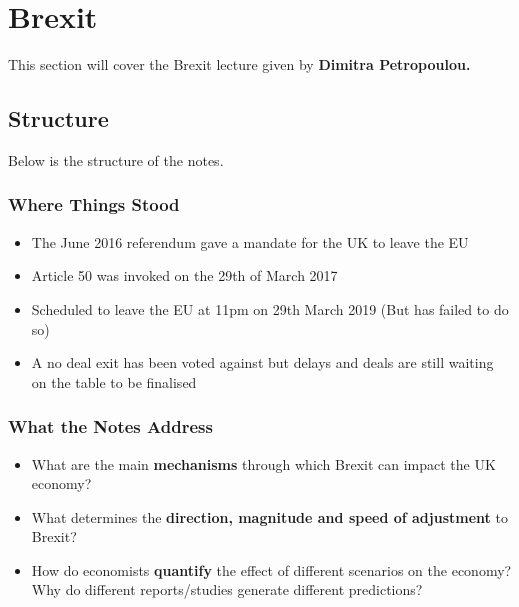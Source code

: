 \documentclass[12pt, letterpaper]{article}
\begin{document}
\newpage
\section{Brexit}
This section will cover the Brexit lecture given by \textbf{Dimitra Petropoulou.}

\subsection{Structure}
Below is the structure of the notes.
\subsubsection{Where Things Stood}
\begin{itemize}
	\item The June 2016 referendum gave a mandate for the UK to leave the EU
	\item Article 50 was invoked on the 29th of March 2017
	\item Scheduled to leave the EU at 11pm on 29th March 2019 (But has failed to do so)
	\item A no deal exit has been voted against but delays and deals are still waiting on the table to be finalised
\end{itemize}
\subsubsection{What the Notes Address}
\begin{itemize}
	\item What are the main \textbf{mechanisms} through which Brexit can impact the UK economy?
	\item What determines the \textbf{direction, magnitude and speed of adjustment} to Brexit?
	\item How do economists \textbf{quantify} the effect of different scenarios on the economy? Why do different reports/studies generate different predictions?
\end{itemize}
\end{document}
